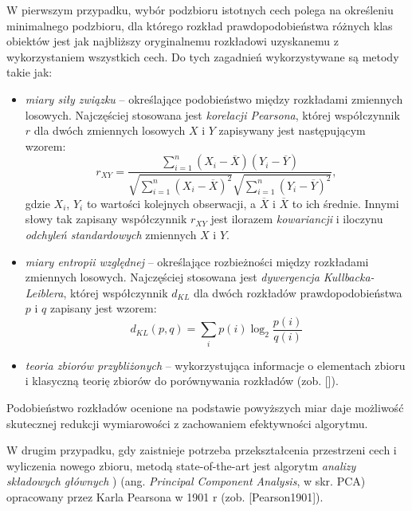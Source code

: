 W pierwszym przypadku, wybór podzbioru istotnych cech polega na określeniu minimalnego podzbioru, dla którego rozkład prawdopodobieństwa różnych klas obiektów jest jak najbliższy oryginalnemu rozkładowi uzyskanemu z wykorzystaniem wszystkich cech. Do tych zagadnień wykorzystywane są metody takie jak:
\begin{itemize}
	\item \textit{miary siły związku} -- określające podobieństwo między rozkładami zmiennych losowych. Najczęściej stosowana jest \textit{korelacji Pearsona}, której współczynnik $r$ dla dwóch zmiennych losowych $X$ i $Y$ zapisywany jest następującym wzorem:
	\begin{equation}
	r_{XY} = \frac{\sum_{i=1}^n (X_i - \overline{X})(Y_i - \overline{Y})}{\sqrt{\sum_{i=1}^n (X_i - \overline{X})^2} \sqrt{\sum_{i=1}^n (Y_i - \overline{Y})^2}},
	\end{equation}
	gdzie $X_i$, $Y_i$ to wartości kolejnych obserwacji, a $\overline{X}$ i $\overline{X}$ to ich średnie. Innymi słowy tak zapisany współczynnik $r_{XY}$ jest ilorazem \textit{kowariancji} i iloczynu \textit{odchyleń standardowych} zmiennych $X$ i $Y$.
	\item \textit{miary entropii względnej} --  określające rozbieżności między rozkładami zmiennych losowych. Najczęściej stosowana jest \textit{dywergencja Kullbacka-Leiblera}, której współczynnik $d_{KL}$ dla dwóch rozkładów prawdopodobieństwa $p$ i $q$ zapisany jest wzorem: 
	\begin{equation}
	d_{KL}(p,q) = \sum_{i} p(i) \log_2 \frac{p(i)}{q(i)}
	\end{equation}
	\item \textit{teoria zbiorów przybliżonych} -- wykorzystująca informacje o elementach zbioru i klasyczną teorię zbiorów do porównywania rozkładów (zob. []).
\end{itemize}
Podobieństwo rozkładów ocenione na podstawie powyższych miar daje możliwość skutecznej redukcji wymiarowości z zachowaniem efektywności algorytmu.

W drugim przypadku, gdy zaistnieje potrzeba przekształcenia przestrzeni cech i wyliczenia nowego zbioru, metodą state-of-the-art jest algorytm \textit{analizy składowych głównych} ) (ang. \textit{Principal Component Analysis}, w skr. PCA) opracowany przez Karla Pearsona w 1901 r (zob. [Pearson1901]).  

